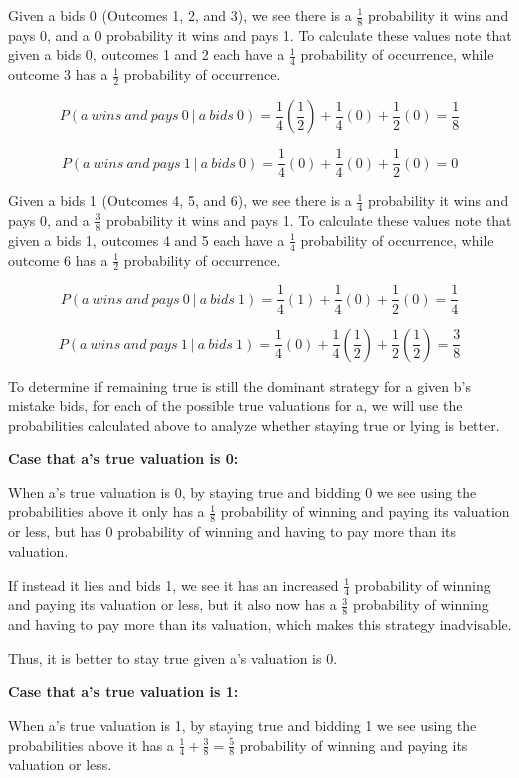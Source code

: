 \documentclass[twoside]{article}
\begin{document}
Given a bids 0 (Outcomes 1, 2, and 3), we see there is a $\frac{1}{8}$ probability it wins and pays 0, and a 0 probability it wins and pays 1. To calculate these values note that given a bids 0, outcomes 1 and 2 each have a $\frac{1}{4}$ probability of occurrence, while outcome 3 has a $\frac{1}{2}$ probability of occurrence.

$$P(a\>wins\>and\>pays\>0\>|\>a\>bids\>0) = \frac{1}{4}(\frac{1}{2}) + \frac{1}{4}(0) + \frac{1}{2}(0) = \frac{1}{8}$$

$$P(a\>wins\>and\>pays\>1\>|\>a\>bids\>0) = \frac{1}{4}(0) + \frac{1}{4}(0) + \frac{1}{2}(0) = 0$$

Given a bids 1 (Outcomes 4, 5, and 6), we see there is a $\frac{1}{4}$ probability it wins and pays 0, and a $\frac{3}{8}$ probability it wins and pays 1. To calculate these values note that given a bids 1, outcomes 4 and 5 each have a $\frac{1}{4}$ probability of occurrence, while outcome 6 has a $\frac{1}{2}$ probability of occurrence.

$$P(a\>wins\>and\>pays\>0\>|\>a\>bids\>1) = \frac{1}{4}(1) + \frac{1}{4}(0) + \frac{1}{2}(0) = \frac{1}{4}$$

$$P(a\>wins\>and\>pays\>1\>|\>a\>bids\>1) = \frac{1}{4}(0) + \frac{1}{4}(\frac{1}{2}) + \frac{1}{2}(\frac{1}{2}) = \frac{3}{8}$$

To determine if remaining true is still the dominant strategy for a given b's mistake bids, for each of the possible true valuations for a, we will  use the probabilities calculated above to analyze whether staying true or lying is better. 

\newpage
{\bf Case that a's true valuation is 0:}

When a's true valuation is 0, by staying true and bidding 0 we see using the probabilities above it only has a $\frac{1}{8}$ probability of winning and paying its valuation or less, but has 0 probability of winning and having to pay more than its valuation.

If instead it lies and bids 1, we see it has an increased $\frac{1}{4}$ probability of winning and paying its valuation or less, but it also now has a $\frac{3}{8}$ probability of winning and having to pay more than its valuation, which makes this strategy inadvisable.

Thus, it is better to stay true given a's valuation is 0.

{\bf Case that a's true valuation is 1:}

When a's true valuation is 1, by staying true and bidding 1 we see using the probabilities above it has a $\frac{1}{4} + \frac{3}{8} = \frac{5}{8}$ probability of winning and paying its valuation or less.
\end{document}
